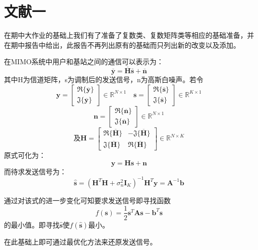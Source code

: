 \documentclass[twocolumn]{ctexart}
\begin{document}
\section{文献一}
\par 在期中大作业的基础上我们有了准备了复数类、复数矩阵类等相应的基础准备，并在期中报告中给出，此报告不再列出原有的基础而只列出新的改变以及添加。
\par 在MIMO系统中用户和基站之间的通信可以表示为：\[\overline{\mathbf{y}}=\overline{\mathbf{H}} \overline{\mathbf{s}}+\overline{\mathbf{n}}\]
其中H为信道矩阵，s为调制后的发送信号，n为高斯白噪声。若令
\[\mathbf{y}=\left[\begin{array}{l}
\mathfrak{R}\{\overline{\mathbf{y}}\} \\
\mathfrak{J}\{\overline{\mathbf{y}}\}
\end{array}\right] \in \mathbb{R}^{N \times 1} \quad \mathbf{s}=\left[\begin{array}{l}
\mathfrak{R}\{\overline{\mathbf{s}}\} \\
\mathfrak{J}\{\overline{\mathbf{s}}\}
\end{array}\right] \in \mathbb{R}^{K \times 1}\]
\[\mathbf{n}= \left[\begin{array}{l}
\mathfrak{R}\{\overline{\mathbf{n}}\} \\
\mathfrak{J}\{\overline{\mathbf{n}}\}
\end{array}\right] \in \mathbb{R}^{N \times 1} \]\[\text{及} \mathbf{H}=\left[\begin{array}{cc}
\mathfrak{R}\{\overline{\mathbf{H}}\} & -\mathfrak{J}\{\overline{\mathbf{H}}\} \\
\mathfrak{J}\{\overline{\mathbf{H}}\} & \mathfrak{R}\{\overline{\mathbf{H}}\}
\end{array}\right] \in \mathbb{R}^{N \times K}\]
原式可化为：\[\mathbf{y}=\mathbf{H} \mathbf{s}+\mathbf{n}\]
而待求发送信号为：
\begin{equation}
\hat{\mathbf{s}}=\left(\mathbf{H}^{T} \mathbf{H}+\sigma_{n}^{2} \mathbf{I}_{K}\right)^{-1} \mathbf{H}^{T} \mathbf{y}=\mathbf{A}^{-1} \mathbf{b} \label{fangcheng}
\end{equation}

通过对该式的进一步变化可知要求发送信号即寻找函数\[f(\mathbf{s})=\frac{1}{2} \mathbf{s}^{T} \mathbf{A s}-\mathbf{b}^{T} \mathbf{s}\]
的最小值。即寻找$\mathbf{\hat{s}}$使$ f(\mathbf{\hat{s}}) $最小。
\par 在此基础上即可通过最优化方法来还原发送信号。
\end{document}
